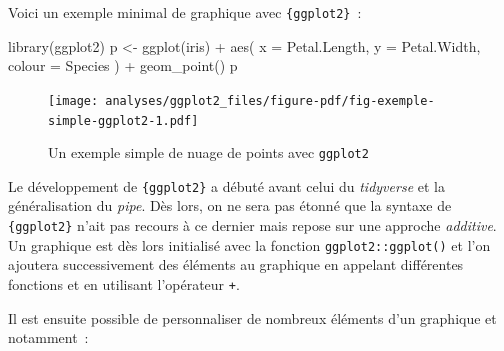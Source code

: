 \documentclass[
  letterpaper,
  DIV=11,
  numbers=noendperiod,
  oneside]{scrreprt}
\newenvironment{Shaded}{\begin{snugshade}}{\end{snugshade}}
\newcommand{\AttributeTok}[1]{\textcolor[rgb]{0.40,0.45,0.13}{#1}}
\newcommand{\FunctionTok}[1]{\textcolor[rgb]{0.28,0.35,0.67}{#1}}
\newcommand{\NormalTok}[1]{\textcolor[rgb]{0.00,0.23,0.31}{#1}}
\newcommand{\OtherTok}[1]{\textcolor[rgb]{0.00,0.23,0.31}{#1}}
\newcommand{\SpecialCharTok}[1]{\textcolor[rgb]{0.37,0.37,0.37}{#1}}
\begin{document}
Voici un exemple minimal de graphique avec \texttt{\{ggplot2\}}~:

\begin{Shaded}
\begin{Highlighting}[]
\FunctionTok{library}\NormalTok{(ggplot2)}
\NormalTok{p }\OtherTok{\textless{}{-}} 
  \FunctionTok{ggplot}\NormalTok{(iris) }\SpecialCharTok{+}
  \FunctionTok{aes}\NormalTok{(}
    \AttributeTok{x =}\NormalTok{ Petal.Length, }
    \AttributeTok{y =}\NormalTok{ Petal.Width, }
    \AttributeTok{colour =}\NormalTok{ Species}
\NormalTok{  ) }\SpecialCharTok{+}
  \FunctionTok{geom\_point}\NormalTok{()}
\NormalTok{p}
\end{Highlighting}
\end{Shaded}

\begin{figure}[H]

{\centering \texttt{[image: analyses/ggplot2\_files/figure-pdf/fig-exemple-simple-ggplot2-1.pdf]}

}

\caption{\label{fig-exemple-simple-ggplot2}Un exemple simple de nuage de
points avec \texttt{ggplot2}}

\end{figure}

\begin{tcolorbox}[enhanced jigsaw, colbacktitle=quarto-callout-important-color!10!white, opacityback=0, toprule=.15mm, colback=white, coltitle=black, bottomtitle=1mm, toptitle=1mm, titlerule=0mm, rightrule=.15mm, title=\textcolor{quarto-callout-important-color}{\faExclamation}\hspace{0.5em}{Syntaxe additive}, breakable, bottomrule=.15mm, opacitybacktitle=0.6, arc=.35mm, left=2mm, leftrule=.75mm, colframe=quarto-callout-important-color-frame]

Le développement de \texttt{\{ggplot2\}} a débuté avant celui du
\emph{tidyverse} et la généralisation du \emph{pipe}. Dès lors, on ne
sera pas étonné que la syntaxe de \texttt{\{ggplot2\}} n'ait pas recours
à ce dernier mais repose sur une approche \emph{additive}. Un graphique
est dès lors initialisé avec la fonction \texttt{ggplot2::ggplot()} et
l'on ajoutera successivement des éléments au graphique en appelant
différentes fonctions et en utilisant l'opérateur \texttt{+}.

\end{tcolorbox}

Il est ensuite possible de personnaliser de nombreux éléments d'un
graphique et notamment~:
\end{document}
